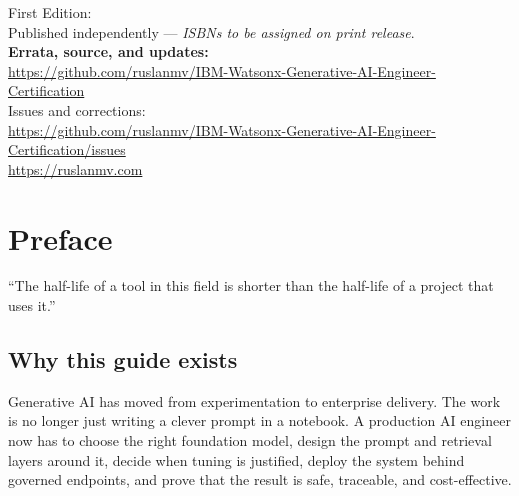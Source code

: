 \begin{center}
    First Edition: \the\year\\
    Published independently --- \emph{ISBNs to be assigned on print release}.\\[1cm]

    \textbf{Errata, source, and updates:}\\
    \url{https://github.com/ruslanmv/IBM-Watsonx-Generative-AI-Engineer-Certification}\\[0.2cm]
    Issues and corrections:\\
    \url{https://github.com/ruslanmv/IBM-Watsonx-Generative-AI-Engineer-Certification/issues}\\[0.4cm]
    \url{https://ruslanmv.com}
\end{center}
\vspace*{\fill}

\cleardoublepage

\pagestyle{plain}
\renewcommand{\contentsname}{Contents}
{\let\cleardoublepage\clearpage \tableofcontents}

\cleardoublepage

{\let\cleardoublepage\clearpage
 \pagestyle{plain}
 \renewcommand{\listfigurename}{List of Figures}
 \listoffigures}

\cleardoublepage

{\let\cleardoublepage\clearpage
 \pagestyle{plain}
 \renewcommand{\listtablename}{List of Tables}
 \listoftables}

\cleardoublepage
\pagestyle{fancy}

\chapter*{Preface}

\epigraph{``The half-life of a tool in this field is shorter than the half-life of a project that uses it.''}{}

\section*{Why this guide exists}

Generative AI has moved from experimentation to enterprise delivery. The work is no longer just writing a clever prompt in a notebook. A production AI engineer now has to choose the right foundation model, design the prompt and retrieval layers around it, decide when tuning is justified, deploy the system behind governed endpoints, and prove that the result is safe, traceable, and cost-effective.

